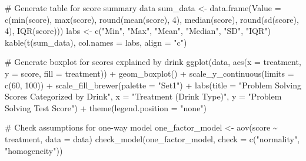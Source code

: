 \documentclass[
  letterpaper,
  DIV=11,
  numbers=noendperiod]{scrartcl}
\newenvironment{Shaded}{\begin{snugshade}}{\end{snugshade}}
\newcommand{\AttributeTok}[1]{\textcolor[rgb]{0.40,0.45,0.13}{#1}}
\newcommand{\CommentTok}[1]{\textcolor[rgb]{0.37,0.37,0.37}{#1}}
\newcommand{\DecValTok}[1]{\textcolor[rgb]{0.68,0.00,0.00}{#1}}
\newcommand{\FunctionTok}[1]{\textcolor[rgb]{0.28,0.35,0.67}{#1}}
\newcommand{\NormalTok}[1]{\textcolor[rgb]{0.00,0.23,0.31}{#1}}
\newcommand{\OtherTok}[1]{\textcolor[rgb]{0.00,0.23,0.31}{#1}}
\newcommand{\SpecialCharTok}[1]{\textcolor[rgb]{0.37,0.37,0.37}{#1}}
\newcommand{\StringTok}[1]{\textcolor[rgb]{0.13,0.47,0.30}{#1}}
\begin{document}
\begin{Shaded}
\begin{Highlighting}[]
\CommentTok{\# Generate table for score summary data}
\NormalTok{sum\_data }\OtherTok{\textless{}{-}} \FunctionTok{data.frame}\NormalTok{(}\AttributeTok{Value =} \FunctionTok{c}\NormalTok{(}\FunctionTok{min}\NormalTok{(score), }\FunctionTok{max}\NormalTok{(score), }\FunctionTok{round}\NormalTok{(}\FunctionTok{mean}\NormalTok{(score), }\DecValTok{4}\NormalTok{), }
                                 \FunctionTok{median}\NormalTok{(score), }\FunctionTok{round}\NormalTok{(}\FunctionTok{sd}\NormalTok{(score), }\DecValTok{4}\NormalTok{), }\FunctionTok{IQR}\NormalTok{(score)))}
\NormalTok{labs }\OtherTok{\textless{}{-}} \FunctionTok{c}\NormalTok{(}\StringTok{"Min"}\NormalTok{, }\StringTok{"Max"}\NormalTok{, }\StringTok{"Mean"}\NormalTok{, }\StringTok{"Median"}\NormalTok{, }\StringTok{"SD"}\NormalTok{, }\StringTok{"IQR"}\NormalTok{)}
\FunctionTok{kable}\NormalTok{(}\FunctionTok{t}\NormalTok{(sum\_data), }\AttributeTok{col.names =}\NormalTok{ labs, }\AttributeTok{align =} \StringTok{"c"}\NormalTok{)}

\CommentTok{\# Generate boxplot for scores explained by drink}
\FunctionTok{ggplot}\NormalTok{(data, }\FunctionTok{aes}\NormalTok{(}\AttributeTok{x =}\NormalTok{ treatment, }\AttributeTok{y =}\NormalTok{ score, }\AttributeTok{fill =}\NormalTok{ treatment)) }\SpecialCharTok{+}
  \FunctionTok{geom\_boxplot}\NormalTok{() }\SpecialCharTok{+}
  \FunctionTok{scale\_y\_continuous}\NormalTok{(}\AttributeTok{limits =} \FunctionTok{c}\NormalTok{(}\DecValTok{60}\NormalTok{, }\DecValTok{100}\NormalTok{)) }\SpecialCharTok{+}
  \FunctionTok{scale\_fill\_brewer}\NormalTok{(}\AttributeTok{palette =} \StringTok{"Set1"}\NormalTok{) }\SpecialCharTok{+}
  \FunctionTok{labs}\NormalTok{(}\AttributeTok{title =} \StringTok{"Problem Solving Scores Categorized by Drink"}\NormalTok{,}
  \AttributeTok{x =} \StringTok{"Treatment (Drink Type)"}\NormalTok{, }\AttributeTok{y =} \StringTok{"Problem Solving Test Score"}\NormalTok{) }\SpecialCharTok{+}
  \FunctionTok{theme}\NormalTok{(}\AttributeTok{legend.position =} \StringTok{"none"}\NormalTok{)}

\CommentTok{\# Check assumptions for one{-}way model}
\NormalTok{one\_factor\_model }\OtherTok{\textless{}{-}} \FunctionTok{aov}\NormalTok{(score }\SpecialCharTok{\textasciitilde{}}\NormalTok{ treatment, }\AttributeTok{data =}\NormalTok{ data)}
\FunctionTok{check\_model}\NormalTok{(one\_factor\_model, }\AttributeTok{check =} \FunctionTok{c}\NormalTok{(}\StringTok{"normality"}\NormalTok{, }\StringTok{"homogeneity"}\NormalTok{))  }


\end{Highlighting}
\end{Shaded}
\end{document}
